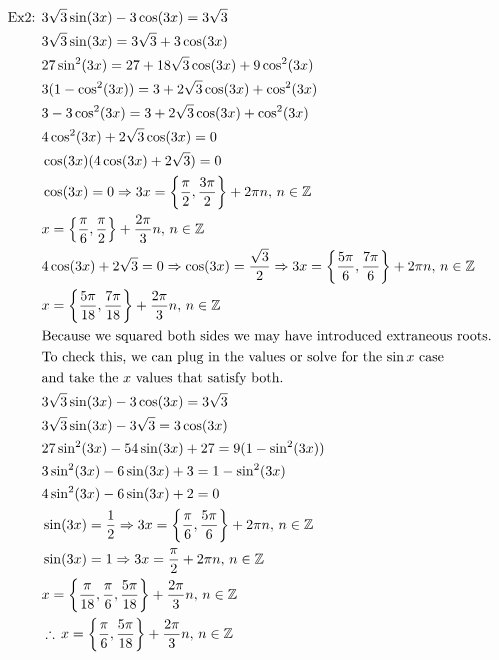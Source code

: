 \documentclass[11pt, fleqn]{article}
\begin{document}
\begin{align*}
    \text{Ex2: }&3\sqrt{3}\sin(3x)-3\cos(3x)=3\sqrt{3}\\
    &3\sqrt{3}\sin(3x)=3\sqrt{3}+3\cos(3x)\\
    &27\sin^2(3x)=27+18\sqrt{3}\cos(3x)+9\cos^2(3x)\\
    &3(1-\cos^2(3x))=3+2\sqrt{3}\cos(3x)+\cos^2(3x)\\
    &3-3\cos^2(3x)=3+2\sqrt{3}\cos(3x)+\cos^2(3x)\\
    &4\cos^2(3x)+2\sqrt{3}\cos(3x)=0\\
    &\cos(3x)(4\cos(3x)+2\sqrt{3})=0\\
    &\cos(3x)=0\Rightarrow3x=\left\{\frac{\pi}{2},\frac{3\pi}{2}\right\}+2\pi n,\,n\in\mathbb{Z}\\
    &x=\left\{\frac{\pi}{6},\frac{\pi}{2}\right\}+\frac{2\pi}{3}n,\,n\in\mathbb{Z}\\
    &4\cos(3x)+2\sqrt{3}=0\Rightarrow\cos(3x)=\frac{\sqrt{3}}{2}\Rightarrow3x=\left\{\frac{5\pi}{6},\frac{7\pi}{6}\right\}+2\pi n,\,n\in\mathbb{Z}\\
    &x=\left\{\frac{5\pi}{18},\frac{7\pi}{18}\right\}+\frac{2\pi}{3}n,\,n\in\mathbb{Z}\\
    &\text{Because we squared both sides we may have introduced extraneous roots.}\\
    &\text{To check this, we can plug in the values or solve for the $\sin x$ case}\\
    &\text{and take the $x$ values that satisfy both.}\\
    &3\sqrt{3}\sin(3x)-3\cos(3x)=3\sqrt{3}\\
    &3\sqrt{3}\sin(3x)-3\sqrt{3}=3\cos(3x)\\
    &27\sin^2(3x)-54\sin(3x)+27=9(1-\sin^2(3x))\\
    &3\sin^2(3x)-6\sin(3x)+3=1-\sin^2(3x)\\
    &4\sin^2(3x)-6\sin(3x)+2=0\\
    &\sin(3x)=\frac{1}{2}\Rightarrow3x=\left\{\frac{\pi}{6},\frac{5\pi}{6}\right\}+2\pi n,\,n\in\mathbb{Z}\\
    &\sin(3x)=1\Rightarrow3x=\frac{\pi}{2}+2\pi n,\,n\in\mathbb{Z}\\
    &x=\left\{\frac{\pi}{18},\frac{\pi}{6},\frac{5\pi}{18}\right\}+\frac{2\pi}{3}n,\,n\in\mathbb{Z}\\
    &\therefore\,x=\left\{\frac{\pi}{6},\frac{5\pi}{18}\right\}+\frac{2\pi}{3}n,\,n\in\mathbb{Z}
\end{align*}
\end{document}
